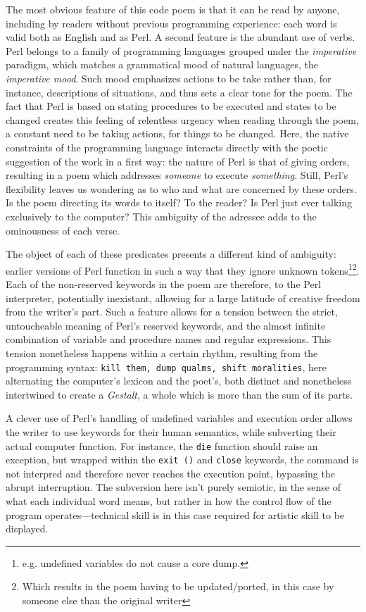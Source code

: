 \documentclass{article}
\begin{document}
The most obvious feature of this code poem is that it can be read by anyone, including by readers without previous programming experience: each word is valid both as English and as Perl. A second feature is the abundant use of verbs. Perl belongs to a family of programming languages grouped under the \emph{imperative} paradigm, which matches a grammatical mood of natural languages, the \emph{imperative mood}. Such mood emphasizes actions to be take rather than, for instance, descriptions of situations, and thus sets a clear tone for the poem. The fact that Perl is based on stating procedures to be executed and states to be changed creates this feeling of relentless urgency when reading through the poem, a constant need to be taking actions, for things to be changed. Here, the native constraints of the programming language interacts directly with the poetic suggestion of the work in a first way: the nature of Perl is that of giving orders, resulting in a poem which addresses \emph{someone} to execute \emph{something}. Still, Perl's flexibility leaves us wondering as to who and what are concerned by these orders. Is the poem directing its words to itself? To the reader? Is Perl just ever talking exclusively to the computer? This ambiguity of the adressee adds to the ominousness of each verse.

The object of each of these predicates presents a different kind of ambiguity: earlier versions of Perl function in such a way that they ignore unknown tokens\footnote{e.g. undefined variables do not cause a core dump.}\footnote{Which results in the poem having to be updated/ported, in this case by someone else than the original writer}. Each of the non-reserved keywords in the poem are therefore, to the Perl interpreter, potentially inexistant, allowing for a large latitude of creative freedom from the writer's part. Such a feature allows for a tension between the strict, untoucheable meaning of Perl's reserved keywords, and the almost infinite combination of variable and procedure names and regular expressions. This tension nonetheless happens within a certain rhythm, resulting from the programming syntax: \lstinline{kill them, dump qualms, shift moralities}, here alternating the computer's lexicon and the poet's, both distinct and nonetheless intertwined to create a \emph{Gestalt}, a whole which is more than the sum of its parts.

A clever use of Perl's handling of undefined variables and execution order allows the writer to use keywords for their human semantics, while subverting their actual computer function. For instance, the \lstinline{die} function should raise an exception, but wrapped within the \lstinline{exit ()} and \lstinline{close} keywords, the command is not interpred and therefore never reaches the execution point, bypassing the abrupt interruption. The subversion here isn't purely semiotic, in the sense of what each individual word means, but rather in how the control flow of the program operates—technical skill is in this case required for artistic skill to be displayed.
\end{document}
